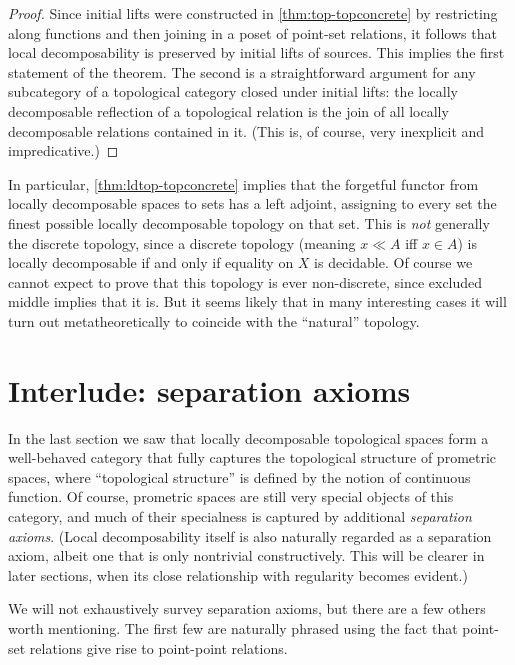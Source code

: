 \documentclass{article}
\begin{document}
\begin{proof}
  Since initial lifts were constructed in \cref{thm:top-topconcrete} by restricting along functions and then joining in a poset of point-set relations, it follows that local decomposability is preserved by initial lifts of sources.
  This implies the first statement of the theorem.
  The second is a straightforward argument for any subcategory of a topological category closed under initial lifts: the locally decomposable reflection of a topological relation is the join of all locally decomposable relations contained in it.
  (This is, of course, very inexplicit and impredicative.)
\end{proof}

\begin{rmk}
  In particular, \cref{thm:ldtop-topconcrete} implies that the forgetful functor from locally decomposable spaces to sets has a left adjoint, assigning to every set the finest possible locally decomposable topology on that set.
  This is \emph{not} generally the discrete topology, since a discrete topology (meaning $x\ll A$ iff $x\in A$) is locally decomposable if and only if equality on $X$ is decidable.
  Of course we cannot expect to prove that this topology is ever non-discrete, since excluded middle implies that it is.
  But it seems likely that in many interesting cases it will turn out metatheoretically to coincide with the ``natural'' topology.
\end{rmk}


\section{Interlude: separation axioms}
\label{sec:separation}

In the last section we saw that locally decomposable topological spaces form a well-behaved category that fully captures the topological structure of prometric spaces, where ``topological structure'' is defined by the notion of continuous function.
Of course, prometric spaces are still very special objects of this category, and much of their specialness is captured by additional \emph{separation axioms}.
(Local decomposability itself is also naturally regarded as a separation axiom, albeit one that is only nontrivial constructively.
This will be clearer in later sections, when its close relationship with regularity becomes evident.)

We will not exhaustively survey separation axioms, but there are a few others worth mentioning.
The first few are naturally phrased using the fact that point-set relations give rise to point-point relations.
\end{document}
